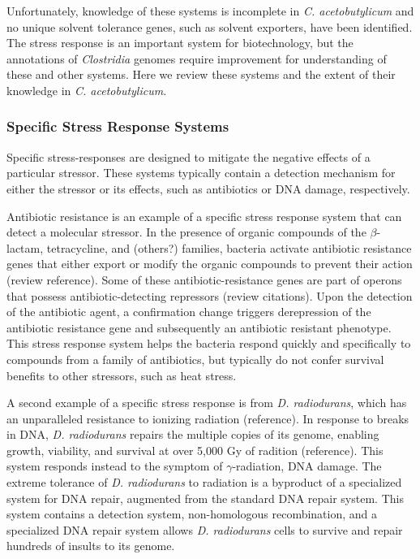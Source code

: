 Unfortunately, knowledge of these systems is incomplete in \textit{C. acetobutylicum} and no unique solvent tolerance genes, such as solvent exporters, have been identified. The stress response is an important system for biotechnology, but the annotations of \textit{Clostridia} genomes require improvement for understanding of these and other systems. Here we review these systems and the extent of their knowledge in \textit{C. acetobutylicum}.


\subsubsection{Specific Stress Response Systems}
Specific stress-responses are designed to mitigate the negative effects of a particular stressor. These systems typically contain a detection mechanism for either the stressor or its effects, such as antibiotics or DNA damage, respectively.

Antibiotic resistance is an example of a specific stress response system that can detect a molecular stressor. In the presence of organic compounds of the $\beta$-lactam, tetracycline, and (others?) families, bacteria activate antibiotic resistance genes that either export or modify the organic compounds to prevent their action (review reference). Some of these antibiotic-resistance genes are part of operons that possess antibiotic-detecting repressors (review citations). Upon the detection of the antibiotic agent, a confirmation change triggers derepression of the antibiotic resistance gene and subsequently an antibiotic resistant phenotype. This stress response system helps the bacteria respond quickly and specifically to compounds from a family of antibiotics, but typically do not confer survival benefits to other stressors, such as heat stress.

A second example of a specific stress response is from \textit{D. radiodurans}, which has an unparalleled resistance to ionizing radiation (reference). In response to breaks in DNA, \textit{D. radiodurans} repairs the multiple copies of its genome, enabling growth, viability, and survival at over 5,000 Gy of radition (reference). This system responds instead to the symptom of $\gamma$-radiation, DNA damage. The extreme tolerance of \textit{D. radiodurans} to radiation is a byproduct of a specialized system for DNA repair, augmented from the standard DNA repair system. This system contains a detection system, non-homologous recombination, and a specialized DNA repair system allows \textit{D. radiodurans} cells to survive and repair hundreds of insults to its genome. 

